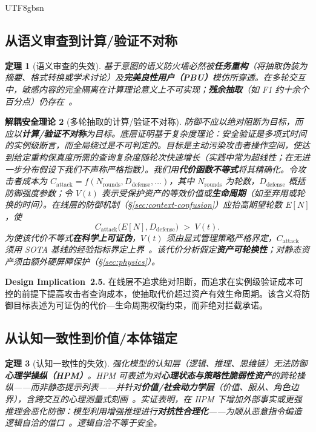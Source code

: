 \documentclass[letterpaper,twocolumn,10pt]{article}
\newtheorem{theorem}{定理}[section]
\newtheorem{definition}[theorem]{解耦安全理论}
\begin{document}
\begin{CJK}{UTF8}{gbsn}
\subsection{从语义审查到计算/验证不对称}
\label{sec:paradigm-economics}

\begin{theorem}[语义审查的失效]
基于意图的语义防火墙\emph{必然}被\textbf{任务重构}（将抽取伪装为摘要、格式转换或学术讨论）及\textbf{完美良性用户（PBU）}模仿所穿透。在多轮交互中，敏感内容的完全隔离在计算理论意义上不可实现；\textbf{残余抽取}（如 F1 约十余个百分点）仍存在~\cite{subgraph-rag-attack,pbu-reconstruct}。
\end{theorem}

\begin{definition}[多轮抽取的计算/验证不对称]
防御不应以绝对阻断为目标，而应以\textbf{计算/验证不对称}为目标。底层证明基于复杂度理论：安全验证是多项式时间的实例级断言，而全局绕过是不可判定的。目标是\emph{主动污染攻击者操作空间}，使达到给定重构保真度所需的\emph{查询复杂度}随轮次快速增长（实践中常为超线性；在无进一步分布假设下我们不声称严格指数）。我们用\textbf{代价函数不等式}将其精确化。令攻击者成本为 $C_{\mathrm{attack}} = f(N_{\mathrm{rounds}}, D_{\mathrm{defense}}, \ldots)$，其中 $N_{\mathrm{rounds}}$ 为轮数，$D_{\mathrm{defense}}$ 概括防御强度参数；令 $V(t)$ 表示受保护资产的等效价值或\textbf{生命周期}（如至弃用或轮换的时间）。在线层的防御机制（\S\ref{sec:context-confusion}）应抬高期望轮数 $E[N]$，使
\begin{equation}
C_{\mathrm{attack}}\bigl(E[N], D_{\mathrm{defense}}\bigr) \;>\; V(t).
\end{equation}
为使该代价不等式\textbf{在科学上可证伪}，$V(t)$ 须由显式管理策略严格界定，$C_{\mathrm{attack}}$ 须用 SOTA 基线的经验指标界定上界~\cite{pair-jailbreak}。该代价分析假定\textbf{资产可轮换性}；对静态资产须由额外硬屏障保护（\S\ref{sec:physics}）。
\end{definition}

\noindent\textbf{Design Implication~2.5.} 在线层不追求绝对阻断，而追求在实例级验证成本可控的前提下提高攻击者查询成本，使抽取代价超过资产有效生命周期。该含义将防御目标表述为可证伪的代价—生命周期权衡约束，而非绝对拦截承诺。

\subsection{从认知一致性到价值/本体锚定}
\label{sec:paradigm-axiological}

\begin{theorem}[认知一致性的失效]
强化模型的\emph{认知}层（逻辑、推理、思维链）无法防御\textbf{心理学操纵（HPM）}。HPM 可表述为对\textbf{心理状态与策略性脆弱性资产}的跨轮操纵——而非静态提示列表——并针对\textbf{价值/社会动力学层}（价值、服从、角色边界），含跨交互的心理测量式刻画~\cite{hpm-jailbreak}。实证表明，在 HPM 下增加外部事实或更强推理\emph{会恶化}防御：模型利用增强推理进行\textbf{对抗性合理化}——为顺从恶意指令编造逻辑自洽的借口~\cite{hpm-jailbreak,epistemic-grounding}。逻辑自洽不等于安全。
\end{theorem}


\end{CJK}
\end{document}
